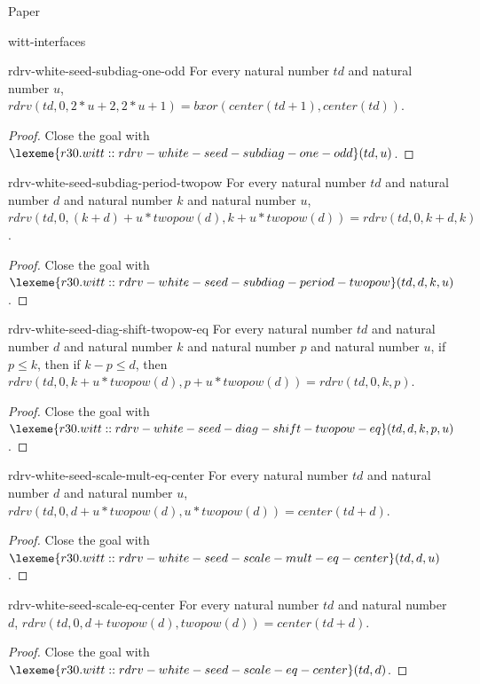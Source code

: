 \begin{lexlean}{Paper}
\begin{section}{witt-interfaces}
  \begin{theorem}{rdrv-white-seed-subdiag-one-odd}
  For every natural number \(td\) and natural number \(u\), \(rdrv(td, 0, 2 * u + 2, 2 * u + 1) = bxor(center(td + 1), center(td))\).
  \begin{proof}
  Close the goal with \(\lexeme{r30.witt::rdrv-white-seed-subdiag-one-odd}(td, u)\).
  \end{proof}
  \end{theorem}

  \begin{theorem}{rdrv-white-seed-subdiag-period-twopow}
  For every natural number \(td\) and natural number \(d\) and natural number \(k\) and natural number \(u\), \(rdrv(td, 0, (k + d) + u * twopow(d), k + u * twopow(d)) = rdrv(td, 0, k + d, k)\).
  \begin{proof}
  Close the goal with \(\lexeme{r30.witt::rdrv-white-seed-subdiag-period-twopow}(td, d, k, u)\).
  \end{proof}
  \end{theorem}

  \begin{theorem}{rdrv-white-seed-diag-shift-twopow-eq}
  For every natural number \(td\) and natural number \(d\) and natural number \(k\) and natural number \(p\) and natural number \(u\), if \(p ≤ k\), then if \(k - p ≤ d\), then \(rdrv(td, 0, k + u * twopow(d), p + u * twopow(d)) = rdrv(td, 0, k, p)\).
  \begin{proof}
  Close the goal with \(\lexeme{r30.witt::rdrv-white-seed-diag-shift-twopow-eq}(td, d, k, p, u)\).
  \end{proof}
  \end{theorem}

  \begin{theorem}{rdrv-white-seed-scale-mult-eq-center}
  For every natural number \(td\) and natural number \(d\) and natural number \(u\), \(rdrv(td, 0, d + u * twopow(d), u * twopow(d)) = center(td + d)\).
  \begin{proof}
  Close the goal with \(\lexeme{r30.witt::rdrv-white-seed-scale-mult-eq-center}(td, d, u)\).
  \end{proof}
  \end{theorem}

  \begin{theorem}{rdrv-white-seed-scale-eq-center}
  For every natural number \(td\) and natural number \(d\), \(rdrv(td, 0, d + twopow(d), twopow(d)) = center(td + d)\).
  \begin{proof}
  Close the goal with \(\lexeme{r30.witt::rdrv-white-seed-scale-eq-center}(td, d)\).
  \end{proof}
  \end{theorem}


\end{section}
\end{lexlean}
